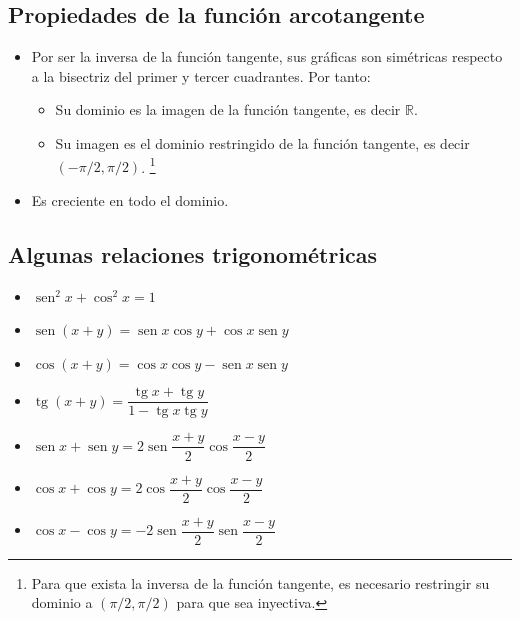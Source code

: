 \documentclass[
  a4paper,
]{scrreport}
\providecommand{\tightlist}{%
  \setlength{\itemsep}{0pt}\setlength{\parskip}{0pt}}\usepackage{longtable,booktabs,array}
\theoremstyle{plain}
\theoremstyle{plain}
\theoremstyle{definition}
\theoremstyle{plain}
\theoremstyle{definition}
\theoremstyle{remark}
\begin{document}
\hypertarget{propiedades-de-la-funciuxf3n-arcotangente}{%
\subsection{Propiedades de la función
arcotangente}\label{propiedades-de-la-funciuxf3n-arcotangente}}

\begin{itemize}
\tightlist
\item
  Por ser la inversa de la función tangente, sus gráficas son simétricas
  respecto a la bisectriz del primer y tercer cuadrantes. Por tanto:

  \begin{itemize}
  \tightlist
  \item
    Su dominio es la imagen de la función tangente, es decir
    \(\mathbb{R}\).
  \item
    Su imagen es el dominio restringido de la función tangente, es decir
    \((-\pi/2,\pi/2)\). \footnote{Para que exista la inversa de la
      función tangente, es necesario restringir su dominio a
      \((\pi/2,\pi/2)\) para que sea inyectiva.}
  \end{itemize}
\item
  Es creciente en todo el dominio.
\end{itemize}

\hypertarget{algunas-relaciones-trigonomuxe9tricas}{%
\subsection{Algunas relaciones
trigonométricas}\label{algunas-relaciones-trigonomuxe9tricas}}

\begin{itemize}
\tightlist
\item
  \(\operatorname{sen}^2 x+\cos^2 x=1\)
\item
  \(\operatorname{sen}(x+y)=\operatorname{sen} x \cos y+\cos x \operatorname{sen} y\)
\item
  \(\cos(x+y)=\cos x \cos y-\operatorname{sen} x \operatorname{sen} y\)
\item
  \(\operatorname{tg} (x+y)= \dfrac{\operatorname{tg} x+\operatorname{tg} y}{1-\operatorname{tg} x \operatorname{tg} y}\)
\item
  \(\operatorname{sen} x + \operatorname{sen} y = 2 \operatorname{sen} \dfrac{x+y}{2}\cos\dfrac{x-y}{2}\)
\item
  \(\cos x + \cos y = 2 \cos \dfrac{x+y}{2}\cos\dfrac{x-y}{2}\)
\item
  \(\cos x - \cos y = -2 \operatorname{sen} \dfrac{x+y}{2}\operatorname{sen}\dfrac{x-y}{2}\)
\end{itemize}
\end{document}
